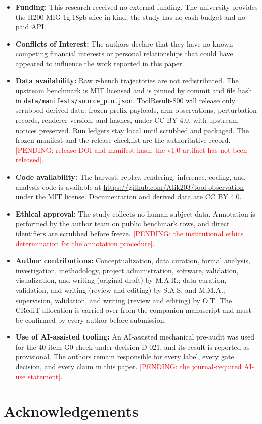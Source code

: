 \documentclass[a4paper,fleqn]{cas-sc}
\newcommand{\pending}[1]{\textcolor{red}{[PENDING: #1]}}
\begin{document}
\begin{itemize}
  \setlength{\itemsep}{0pt}
  \setlength{\parsep}{0pt}
  \item \textbf{Funding:} This research received no external funding. The university provides the
  H200 MIG 1g.18gb slice in kind; the study has no cash budget and no paid API.   \item \textbf{Conflicts of Interest:} The authors declare that they have no known competing
  financial interests or personal relationships that could have appeared to influence the work
  reported in this paper.   \item \textbf{Data availability:} Raw $\tau$-bench trajectories are not redistributed. The
  upstream benchmark is MIT licensed and is pinned by commit and file hash in
  \texttt{data/manifests/source\_pin.json}. ToolResult-800 will release only scrubbed derived
  data: frozen prefix payloads, arm observations, perturbation records, renderer version, and
  hashes, under CC BY 4.0, with upstream notices preserved. Run ledgers stay local until scrubbed and
  packaged. The frozen manifest and the release checklist are the authoritative record.
  \pending{release DOI and manifest hash; the v1.0 artifact has not been released}.   \item \textbf{Code availability:} The harvest, replay, rendering, inference, coding, and
  analysis code is available at \url{https://github.com/Atik203/tool-observation} under the MIT
  license. Documentation and derived data are CC BY 4.0.   \item \textbf{Ethical approval:} The study collects no human-subject data. Annotation is
  performed by the author team on public benchmark rows, and direct identifiers are scrubbed
  before freeze. \pending{the institutional ethics determination for the annotation procedure}.   \item \textbf{Author contributions:} Conceptualization, data curation, formal analysis,
  investigation, methodology, project administration, software, validation, visualization, and
  writing (original draft) by M.A.R.; data curation, validation, and writing (review and editing)
  by S.A.S. and M.M.A.; supervision, validation, and writing (review and editing) by O.T. The
  CRediT allocation is carried over from the companion manuscript and must be confirmed by every
  author before submission.   \item \textbf{Use of AI-assisted tooling:} An AI-assisted mechanical pre-audit was used for the
  40-item G0 check under decision D-021, and its result is reported as provisional. The authors
  remain responsible for every label, every gate decision, and every claim in this paper.
  \pending{the journal-required AI-use statement}.
\end{itemize} \section*{Acknowledgements}
\end{document}
